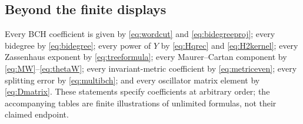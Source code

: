 \subsection*{Beyond the finite displays}
Every BCH coefficient is given by \eqref{eq:wordcut} and
\eqref{eq:bidegreeproj}; every bidegree by \eqref{eq:bidegree}; every power
of $Y$ by \eqref{eq:Hqrec} and \eqref{eq:H2kernel}; every Zassenhaus
exponent by \eqref{eq:treeformula}; every Maurer--Cartan component by
\eqref{eq:MW}--\eqref{eq:thetaW}; every invariant-metric coefficient by
\eqref{eq:metriceven}; every splitting error by \eqref{eq:multibch}; and
every oscillator matrix element by \eqref{eq:Dmatrix}. These statements
specify coefficients at arbitrary order; the accompanying tables are finite
illustrations of unlimited formulas, not their claimed endpoint.
